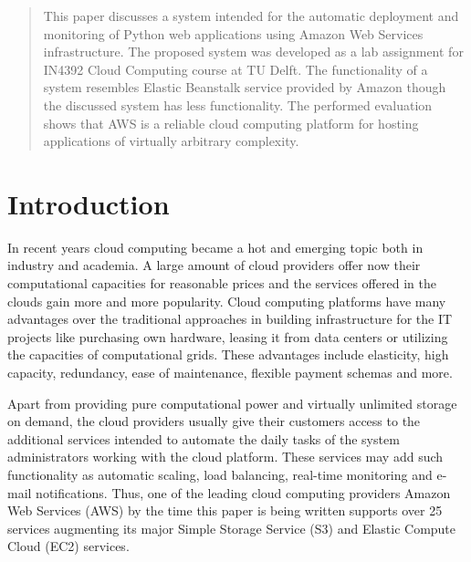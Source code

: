 \documentclass[conference]{IEEEtran}
\begin{document}
\begin{abstract}
This paper discusses a system intended for the automatic deployment and monitoring of Python web applications using Amazon Web Services infrastructure. The proposed system was developed as a lab assignment for IN4392 Cloud Computing course at TU Delft. The functionality of a system resembles Elastic Beanstalk service provided by Amazon though the discussed system has less functionality. The performed evaluation shows that AWS is a reliable cloud computing platform for hosting applications of virtually arbitrary complexity.
\end{abstract}





%
\IEEEpeerreviewmaketitle



\section{Introduction}

In recent years cloud computing became a hot and emerging topic both in industry and academia. A large amount of cloud providers offer now their computational capacities for reasonable prices and the services offered in the clouds gain more and more popularity. Cloud computing platforms have many advantages over the traditional approaches in building infrastructure for the IT projects like purchasing own hardware, leasing it from data centers or utilizing the capacities of computational grids. These advantages include elasticity, high capacity, redundancy, ease of maintenance, flexible payment schemas and more. 

Apart from providing pure computational power and virtually unlimited storage on demand, the cloud providers usually give their customers access to the additional services intended to automate the daily tasks of the system administrators working with the cloud platform. These services may add such functionality as automatic scaling, load balancing, real-time monitoring and e-mail notifications. Thus, one of the leading cloud computing providers Amazon Web Services (AWS) by the time this paper is being written supports over 25 services augmenting its major Simple Storage Service (S3) and Elastic Compute Cloud (EC2) services. 
\end{document}
